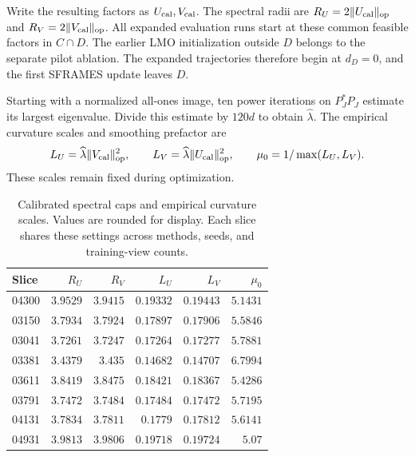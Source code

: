 \documentclass[11pt]{article}
\begin{document}
Write the resulting factors as \(U_{\rm cal},V_{\rm cal}\).
The spectral radii are
\(R_U=2\|U_{\rm cal}\|_{\rm op}\) and
\(R_V=2\|V_{\rm cal}\|_{\rm op}\).
All expanded evaluation runs start at these common feasible factors in
\(C\cap D\). The earlier LMO initialization outside \(D\) belongs to the
separate pilot ablation. The expanded trajectories therefore begin at
\(d_D=0\), and the first SFRAMES update leaves \(D\).

Starting with a normalized all-ones image, ten power iterations on
\(P_J^\ast P_J\) estimate its largest eigenvalue. Divide this estimate by
\(120d\) to obtain \(\widehat\lambda\). The empirical curvature scales
and smoothing prefactor are
\[
  L_U=\widehat\lambda\|V_{\rm cal}\|_{\rm op}^2,\qquad
  L_V=\widehat\lambda\|U_{\rm cal}\|_{\rm op}^2,\qquad
  \mu_0=1/\max(L_U,L_V).
\]
These scales remain fixed during optimization.

\begin{table}[!htbp]
\centering
\caption{Calibrated spectral caps and empirical curvature scales. Values are rounded for display. Each slice shares these settings across methods, seeds, and training-view counts.}
\label{tab:calibration}
\small
\setlength{\tabcolsep}{4pt}
\begin{tabular}{@{}lrrrrr@{}}
\toprule
Slice & $R_U$ & $R_V$ & $L_U$ & $L_V$ & $\mu_0$ \\
\midrule
04300 & $3.9529$ & $3.9415$ & $0.19332$ & $0.19443$ & $5.1431$ \\
03150 & $3.7934$ & $3.7924$ & $0.17897$ & $0.17906$ & $5.5846$ \\
03041 & $3.7261$ & $3.7247$ & $0.17264$ & $0.17277$ & $5.7881$ \\
03381 & $3.4379$ & $3.435$ & $0.14682$ & $0.14707$ & $6.7994$ \\
03611 & $3.8419$ & $3.8475$ & $0.18421$ & $0.18367$ & $5.4286$ \\
03791 & $3.7472$ & $3.7484$ & $0.17484$ & $0.17472$ & $5.7195$ \\
04131 & $3.7834$ & $3.7811$ & $0.1779$ & $0.17812$ & $5.6141$ \\
04931 & $3.9813$ & $3.9806$ & $0.19718$ & $0.19724$ & $5.07$ \\
\bottomrule
\end{tabular}
\end{table}
\end{document}
